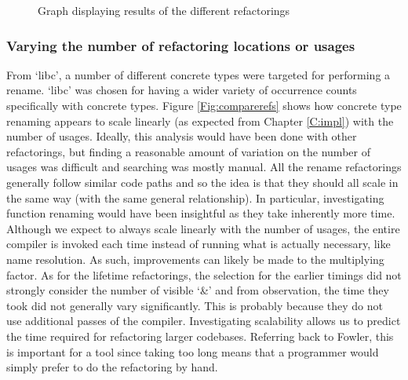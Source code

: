 \begin{figure}[h]
\begin{center}
\caption{Graph displaying results of the different refactorings}
\label{Fig:compareref}
\end{center}
\end{figure}

\subsubsection{Varying the number of refactoring locations or usages}
From `libc', a number of different concrete types were targeted for performing a rename. `libc' was chosen for having a wider variety of occurrence counts specifically with concrete types. Figure \ref{Fig:comparerefs} shows how concrete type renaming appears to scale linearly (as expected from Chapter \ref{C:impl}) with the number of usages. Ideally, this analysis would have been done with other refactorings, but finding a reasonable amount of variation on the number of usages was difficult and searching was mostly manual. All the rename refactorings generally follow similar code paths and so the idea is that they should all scale in the same way (with the same general relationship). In particular, investigating function renaming would have been insightful as they take inherently more time. Although we expect to always scale linearly with the number of usages, the entire compiler is invoked each time instead of running what is actually necessary, like name resolution. As such, improvements can likely be made to the multiplying factor. As for the lifetime refactorings, the selection for the earlier timings did not strongly consider the number of visible `\&' and from observation, the time they took did not generally vary significantly. This is probably because they do not use additional passes of the compiler. Investigating scalability allows us to predict the time required for refactoring larger codebases. Referring back to Fowler, this is important for a tool since taking too long means that a programmer would simply prefer to do the refactoring by hand.

